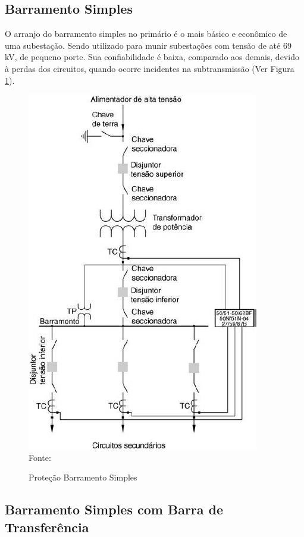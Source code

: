 \subsection{Barramento Simples}

O arranjo do barramento simples no primário é o mais básico e econômico de uma subestação. Sendo utilizado para munir subestações com tensão de até 69 kV, de pequeno porte. Sua confiabilidade é baixa, comparado aos demais, devido à perdas dos circuitos, quando ocorre incidentes na subtransmissão (Ver Figura \ref{fig:BarraSimplesPrimario}).

\begin{figure}[!htb] 
    \centering
    \caption{Proteção Barramento Simples}
    \includegraphics[scale = 0.9]{figuras/BarraSimplesPrimario.png}
    \\ Fonte: \cite{mamede2000protecao}
    \label{fig:BarraSimplesPrimario}
\end{figure}


\subsection{Barramento Simples com Barra de Transferência}

